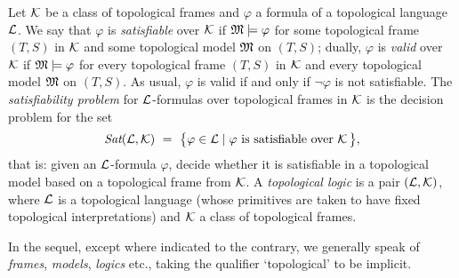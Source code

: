 \documentclass{LMCS}
\theoremstyle{plain}
\newcommand{\Sat}{\textit{Sat}}
\newcommand{\Res}{{S}}\newcommand{\RegC}{\textsc{RC}}
\begin{document}
Let $\mathcal{K}$ be a class of topological frames and $\varphi$ a formula of
a topological language $\mathcal{L}$. We say that $\varphi$ is \emph{satisfiable}
over $\mathcal{K}$ if $\mathfrak{M} \models \varphi$ for some
topological frame $(T,\Res)$ in $\mathcal{K}$ and some topological model $\mathfrak{M}$
on $(T,\Res)$; dually, $\varphi$ is \emph{valid} over $\mathcal{K}$ if $\mathfrak{M}
\models \varphi$ for every topological frame
$(T,\Res)$ in $\mathcal{K}$ and every topological model $\mathfrak{M}$ on
$(T,\Res)$. As usual, $\varphi$ is valid if and only if $\neg \varphi$
is not satisfiable.  The {\em satisfiability problem} for
$\mathcal{L}$-formulas over topological frames in $\mathcal{K}$ is the decision
problem for the set
\begin{equation*}
\Sat (\cL,\cK) ~=~ \bigl\{ \varphi \in \mathcal{L} \mid \text{$\varphi$ is satisfiable over $\cK$}\,\bigr\},
\end{equation*}
that is: given an $\mathcal{L}$-formula $\varphi$, decide whether it is
satisfiable in a topological model based on a topological frame from
$\mathcal{K}$.  A \emph{topological logic} is a pair $(\mathcal{L}, \mathcal{K})$, where $\mathcal{L}$
is a topological language (whose primitives are taken to have fixed
topological interpretations) and $\mathcal{K}$ a class of topological frames.

In the sequel, except where indicated to the contrary, we generally
speak of \emph{frames}, \emph{models}, \emph{logics} etc., taking the qualifier
`topological' to be implicit.
\end{document}
